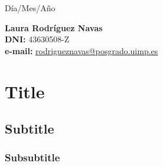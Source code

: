 \documentclass{uimppracticas}
\begin{document}
	
\frontmatter


\begin{center}
\large Día/Mes/Año
\end{center}

\vspace{30mm}

\begin{flushright}
 	{\bf Laura Rodríguez Navas}\\
 	\textbf{DNI:} 43630508-Z\\
 	\textbf{e-mail:} \href{rodrigueznavas@posgrado.uimp.es}{rodrigueznavas@posgrado.uimp.es}
\end{flushright}

\newpage

\tableofcontents

\newpage

\mainmatter

\section{Title}
\subsection{Subtitle}
\subsubsection{Subsubtitle}
\end{document}
